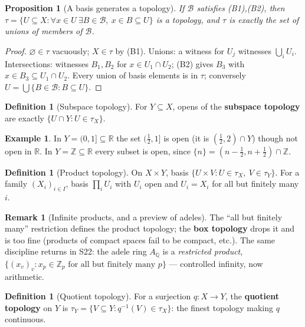 \documentclass[11pt,a4paper]{article}
\newtheorem{proposition}[theorem]{Proposition}
\theoremstyle{definition}
\newtheorem{definition}[theorem]{Definition}
\newtheorem{example}[theorem]{Example}
\newtheorem{remark}[theorem]{Remark}
\newcommand{\R}{\mathbb{R}}
\newcommand{\Z}{\mathbb{Z}}
\newcommand{\Q}{\mathbb{Q}}
\begin{document}
	\begin{proposition}[A basis generates a topology]\label{prop:basis}
		If $\mathcal B$ satisfies (B1),(B2), then $\tau=\{U\subseteq X:\forall x\in U\ \exists B\in\mathcal B,\ x\in B\subseteq U\}$
		is a topology, and $\tau$ is exactly the set of unions of members of $\mathcal B$.
	\end{proposition}
	\begin{proof}
		$\varnothing\in\tau$ vacuously; $X\in\tau$ by (B1). Unions: a witness for $U_j$ witnesses $\bigcup_i U_i$.
		Intersections: witnesses $B_1,B_2$ for $x\in U_1\cap U_2$; (B2) gives $B_3$ with $x\in B_3\subseteq U_1\cap U_2$.
		Every union of basis elements is in $\tau$; conversely $U=\bigcup\{B\in\mathcal B:B\subseteq U\}$.
	\end{proof}
	
	\begin{definition}[Subspace topology]
		For $Y\subseteq X$, opens of the \textbf{subspace topology} are exactly $\{U\cap Y:U\in\tau_X\}$.
	\end{definition}
	
	\begin{example}\label{ex:subspace}
		In $Y=(0,1]\subseteq\R$ the set $(\tfrac12,1]$ is open (it is $(\tfrac12,2)\cap Y$) though not open in $\R$.
		In $Y=\Z\subseteq\R$ every subset is open, since $\{n\}=(n-\tfrac12,n+\tfrac12)\cap\Z$.
	\end{example}
	
	\begin{definition}[Product topology]
		On $X\times Y$, basis $\{U\times V:U\in\tau_X,\ V\in\tau_Y\}$. For a family $(X_i)_{i\in I}$, basis
		$\prod_i U_i$ with $U_i$ open and $U_i=X_i$ for all but finitely many $i$.
	\end{definition}
	
	\begin{remark}[Infinite products, and a preview of adeles]\label{rem:adeles}
		The ``all but finitely many'' restriction defines the product topology; the \textbf{box topology}
		drops it and is too fine (products of compact spaces fail to be compact, etc.). The same discipline
		returns in S22: the adele ring $A_\Q$ is a \emph{restricted product},
		$\{(x_v)_v:x_p\in\Z_p\text{ for all but finitely many }p\}$ --- controlled infinity, now arithmetic.
	\end{remark}
	
	\begin{definition}[Quotient topology]
		For a surjection $q:X\to Y$, the \textbf{quotient topology} on $Y$ is
		$\tau_Y=\{V\subseteq Y:q^{-1}(V)\in\tau_X\}$: the finest topology making $q$ continuous.
	\end{definition}
	
\end{document}
